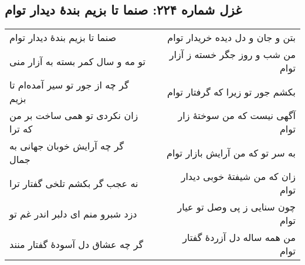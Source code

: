 \begin{center}
\section*{غزل شماره ۲۲۴: صنما تا بزیم بندهٔ دیدار توام}
\label{sec:224}
\begin{longtable}{l p{0.5cm} r}
صنما تا بزیم بندهٔ دیدار توام
&&
بتن و جان و دل دیده خریدار توام
\\
تو مه و سال کمر بسته به آزار منی
&&
من شب و روز جگر خسته ز آزار توام
\\
گر چه از جور تو سیر آمده‌ام تا بزیم
&&
بکشم جور تو زیرا که گرفتار توام
\\
زان نکردی تو همی ساخت بر من که ترا
&&
آگهی نیست که من سوختهٔ زار توام
\\
گر چه آرایش خوبان جهانی به جمال
&&
به سر تو که من آرایش بازار توام
\\
نه عجب گر بکشم تلخی گفتار ترا
&&
زان که من شیفتهٔ خوبی دیدار توام
\\
دزد شبرو منم ای دلبر اندر غم تو
&&
چون سنایی ز پی وصل تو عیار توام
\\
گر چه عشاق دل آسودهٔ گفتار منند
&&
من همه ساله دل آزردهٔ گفتار توام
\\
\end{longtable}
\end{center}
